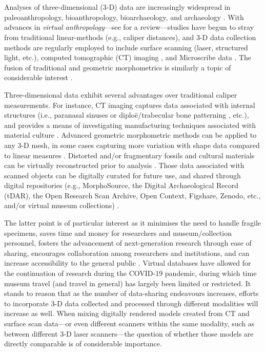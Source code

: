 \documentclass[review]{elsarticle}
\begin{document}
\linenumbers
\section*{}

Analyses of three-dimensional (3-D) data are increasingly widespread in paleoanthropology, bioanthropology, bioarchaeology, and archaeology \citep{RN1746,RN5887,RN303,RN1735,RN5900}. With advances in \textit{virtual anthropology}---see \citet{RN5902} for a review---studies have begun to stray from traditional linear-methods (e.g., caliper distances), and 3-D data collection methods are regularly employed to include surface scanning (laser, structured light, etc.), computed tomographic (CT) imaging \citep{RN11489}, and Microscribe data \citep{RN11487}. The fusion of traditional and geometric morphometrics is similarly a topic of considerable interest \citep{RN11945}.

Three-dimensional data exhibit several advantages over traditional caliper measurements. For instance, CT imaging captures data associated with internal structures (i.e., paranasal sinuses \citep{RN5882,RN11490} or diploë/trabecular bone patterning \citep{RN5885,RN5884}, etc.), and provides a means of investigating manufacturing techniques associated with material culture \citep{RN5891}. Advanced geometric morphometric methods can be applied to any 3-D mesh, in some cases capturing more variation with shape data compared to linear measures \citep{RN5880,RN5888}. Distorted and/or fragmentary fossils and cultural materials can be virtually reconstructed prior to analysis \citep{RN5889,Heid1,RN5903,RN5904,RN8985}. Those data associated with scanned objects can be digitally curated for future use, and shared through digital repositories (e.g., MorphoSource, the Digital Archaeological Record (tDAR), the Open Research Scan Archive, Open Context, Figshare, Zenodo, etc., and/or virtual museum collections) \citep{RN5881,RN5890,RN5587,RN5922,RN11522}.

\newpage
The latter point is of particular interest as it minimises the need to handle fragile specimens, saves time and money for researchers and museum/collection personnel, fosters the advancement of next-generation research through ease of sharing, encourages collaboration among researchers and institutions, and can increase accessibility to the general public \citep{RN5929,RN5930,RN11508,RN11505,RN726,RN4138,RN5902}. Virtual databases have allowed for the continuation of research during the COVID-19 pandemic, during which time museum travel (and travel in general) has largely been limited or restricted. It stands to reason that as the number of data-sharing endeavours increases, efforts to incorporate 3-D data collected and processed through different modalities will increase as well. When mixing digitally rendered models created from CT and surface scan data---or even different scanners within the same modality, such as between different 3-D laser scanners---the question of whether those models are directly comparable is of considerable importance.
\end{document}
